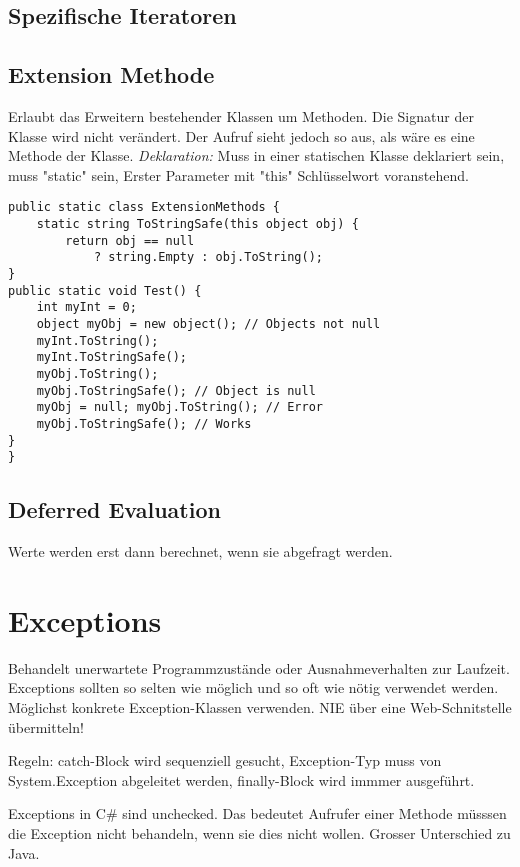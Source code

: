 \subsection{Spezifische Iteratoren}

\subsection{Extension Methode} %
Erlaubt das Erweitern bestehender Klassen um Methoden. Die Signatur der Klasse wird nicht verändert. Der Aufruf sieht jedoch so aus, als wäre es eine Methode der Klasse. \textit{Deklaration:} Muss in einer statischen Klasse deklariert sein, muss "static" sein, Erster Parameter mit "this" Schlüsselwort voranstehend.

\begin{lstlisting}
public static class ExtensionMethods {
	static string ToStringSafe(this object obj) {
		return obj == null
			? string.Empty : obj.ToString();
} 
public static void Test() {
	int myInt = 0; 
	object myObj = new object(); // Objects not null
	myInt.ToString(); 
	myInt.ToStringSafe(); 
	myObj.ToString(); 
	myObj.ToStringSafe(); // Object is null 
	myObj = null; myObj.ToString(); // Error
	myObj.ToStringSafe(); // Works
}
}

\end{lstlisting}

\subsection{Deferred Evaluation}
Werte werden erst dann berechnet, wenn sie abgefragt werden.
\pagebreak

\section{Exceptions} 
Behandelt unerwartete Programmzustände oder Ausnahmeverhalten zur Laufzeit. Exceptions sollten so selten wie möglich und so oft wie nötig verwendet werden.  Möglichst konkrete Exception-Klassen verwenden. NIE über eine Web-Schnitstelle übermitteln!

Regeln: catch-Block wird sequenziell gesucht, Exception-Typ muss von System.Exception abgeleitet werden, finally-Block wird immmer ausgeführt.

Exceptions in C\# sind unchecked. Das bedeutet Aufrufer einer Methode müsssen die Exception nicht behandeln, wenn sie dies nicht wollen. Grosser Unterschied zu Java.

